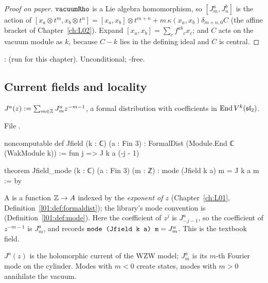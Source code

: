 \begin{proof}[Proof on paper]
$\lean{vacuumRho}$ is a Lie algebra homomorphism, so $[J^a_m,J^b_n]$ is the action of
$[x_a\otimes t^m,x_b\otimes t^n] = [x_a,x_b]\otimes t^{m+n} + m\,\kappa(x_a,x_b)\delta_{m+n,0}C$
(the affine bracket of Chapter~\ref{ch:L02}). Expand $[x_a,x_b] = \sum_cf^{ab}{}_cx_c$; and $C$ acts on
the vacuum module as $k$, because $C-k$ lies in the defining ideal and $C$ is central.
\end{proof}

\begin{status}
\allowbreak{}\allowbreak{}\allowbreak{}: \lean{[propext, Classical.}\allowbreak{}\allowbreak\lean{sound]} (run for this
chapter). Unconditional; -free.
\end{status}

\subsection{Current fields and locality}

\begin{definition}\label{l08:def:Jfield}
$J^a(z) := \sum_{m\in{\mathbb{Z}}}J^a_m z^{-m-1}$, a formal distribution with coefficients in
$\operatorname{End} V^k(\mathfrak{sl}_2)$.
\end{definition}

\noindent File .
\begin{leancode}
noncomputable def Jfield (k : ℂ) (a : Fin 3) : FormalDist (Module.End ℂ (WakModule k)) :=
  fun j => J k a (-j - 1)

theorem Jfield_mode (k : ℂ) (a : Fin 3) (m : ℤ) : mode (Jfield k a) m = J k a m := by
\end{leancode}

\begin{dictionary}
A  is a function ${\mathbb{Z}}\to A$ indexed by the \emph{exponent of $z$}
(Chapter~\ref{ch:L01}, Definition~\ref{l01:def:formaldist}); the library's mode convention is
 (Definition~\ref{l01:def:mode}). Here the coefficient of $z^j$ is
$J^a_{-j-1}$, so the coefficient of $z^{-m-1}$ is $J^a_m$, and  records
$\lean{mode (Jfield k a) m} = J^a_m$. This is the textbook field.
\end{dictionary}

\begin{physics}
$J^a(z)$ is the holomorphic current of the WZW model; $J^a_m$ is its $m$-th Fourier mode on the
cylinder. Modes with $m<0$ create states, modes with $m>0$ annihilate the vacuum.
\end{physics}


